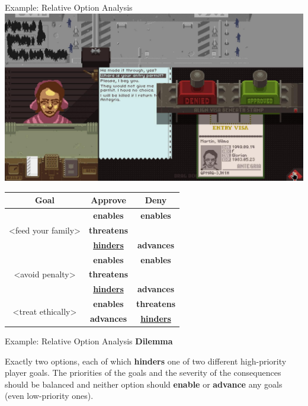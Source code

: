 \documentclass[xcolor=x11names]{beamer}
\begin{document}
\begin{frame}{Example: Relative Option Analysis}
  \centering
  \includegraphics[height=0.3\textheight]{res/papersplease-large.png} \\
  \vspace*{0.5em}
  \footnotesize
  \begin{tabular}{c c c}
    \toprule
    \textbf{Goal} & \textbf{Approve} & \textbf{Deny} \\
    \midrule
    \multirow{3}{*}{<feed your family>} & \textbf{enables} & \textbf{enables} \\
                                        & \textbf{threatens} & \\
                                        & \underline{\textbf{hinders}} & \textbf{advances} \\
    \midrule

    \multirow{3}{*}{<avoid penalty>} & \textbf{enables} & \textbf{enables} \\
                                     & \textbf{threatens} & \\
                                     & \underline{\textbf{hinders}} & \textbf{advances} \\
    \midrule

    \multirow{2}{*}{<treat ethically>} & \textbf{enables} & \textbf{threatens} \\
                                       & \textbf{advances} & \underline{\textbf{hinders}} \\
    \bottomrule
  \end{tabular}
\end{frame}

\begin{frame}{Example: Relative Option Analysis}
  \centering
  \textbf{Dilemma} \\
  \vspace{0.5\baselineskip}
  \raggedright
Exactly two options, each of which \textbf{hinders} one of two different high-priority player goals.
%
The priorities of the goals and the severity of the consequences should be balanced and neither option should \textbf{enable} or \textbf{advance} any goals (even low-priority ones).
\end{frame}
\end{document}
